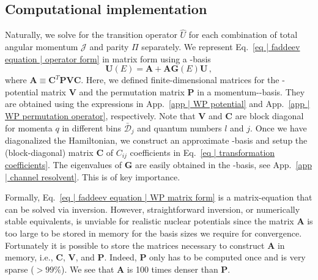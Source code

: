 \documentclass[aps,prc,showpacs,twocolumn,floatfix,nobibnotes,nofootinbib,amsmath,amssymb,longbibliography]{revtex4-2}
\begin{document}
\subsection{Computational implementation}
\label{sec | computational implementation}
Naturally, we solve for the transition operator $\hat{U}$ for each
combination of \NNN{} total angular momentum $\mathcal{J}$ and parity
$\Pi$ separately. We represent Eq.~\eqref{eq | faddeev equation |
  operator form} in matrix form using a \swp-basis
\begin{equation}
	\mathbf{U}(E) = \mathbf{A} + \mathbf{A}\mathbf{G}(E)\mathbf{U} \, ,
	\label{eq | faddeev equation | WP matrix form}
\end{equation}
where $\mathbf{A} \equiv \mathbf{C}^T\mathbf{PVC}$.  Here, we defined
finite-dimensional matrices for the \NN{}-potential matrix
$\mathbf{V}$ and the permutation matrix $\mathbf{P}$ in a \NNN{}
momentum-\fwp-basis. They are obtained using the expressions in
App.~\ref{app | WP potential} and App.~\ref{app | WP permutation
  operator}, respectively. Note that $\mathbf{V}$ and $\mathbf{C}$ are
block diagonal for momenta $q$ in different bins $\bar{\mathcal{D}}_j$
and quantum numbers $l$ and $j$. Once we have diagonalized the \NN{}
Hamiltonian, we construct an approximate \swp-basis and setup the
(block-diagonal) matrix $\mathbf{C}$ of $C_{ij}$ coefficients in
Eq.~\eqref{eq | transformation coefficients}. The eigenvalues of
$\mathbf{G}$ are easily obtained in the \swp-basis, see App.~\ref{app
  | channel resolvent}. This is of key importance.

Formally, Eq.~\eqref{eq | faddeev equation | WP matrix form} is a
matrix-equation that can be solved via inversion. However,
straightforward inversion, or numerically stable equivalents, is
unviable for realistic nuclear potentials since the matrix
$\mathbf{A}$ is too large to be stored in memory for the basis sizes
we require for convergence. Fortunately it is possible to store the
matrices necessary to construct $\mathbf{A}$ in memory, i.e.,
$\mathbf{C}$, $\mathbf{V}$, and $\mathbf{P}$. Indeed, $\mathbf{P}$
only has to be computed once and is very sparse ($>99\%$). We see that
$\mathbf{A}$ is 100 times denser than $\mathbf{P}$.
\end{document}

